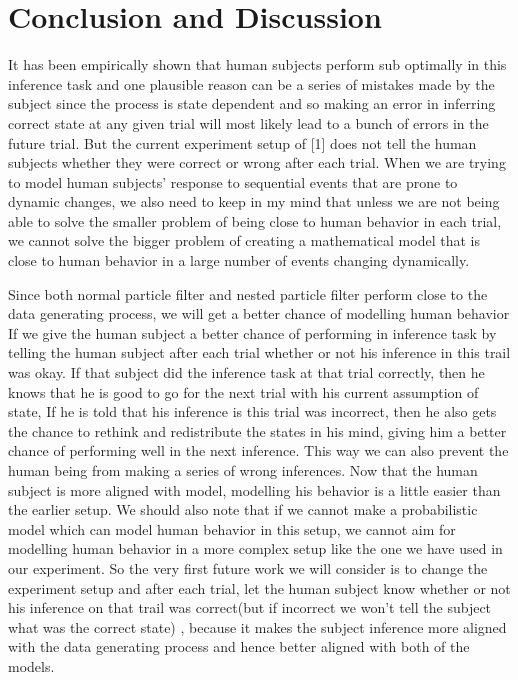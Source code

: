 \documentclass[12pt,letterpaper]{article}
\begin{document}
\section{Conclusion and Discussion}

It has been empirically shown that human subjects perform sub optimally in this inference task and one plausible reason can be a series of mistakes made by the subject since the process is state dependent and so making an error in inferring correct state at any given trial will most likely lead to a bunch of errors in the future trial. But the current experiment setup of [1] does not tell the human subjects whether they were correct or wrong after each trial. When we are trying to model human subjects’ response to sequential events that are prone to dynamic changes, we also need to keep in my mind that unless we are not being able to solve the smaller problem of being close to human behavior in each trial, we cannot solve the bigger problem of creating a mathematical model that is close to human behavior in a large number of events changing dynamically.

Since both normal particle filter and nested particle filter perform close to the data generating process, we will get a better chance of modelling human behavior If we give the human subject a better chance of performing in inference task by telling the human subject after each trial whether or not his inference in this trail was okay. If that subject did the inference task at that trial correctly, then he knows that he is good to go for the next trial with his current assumption of state, If he is told that his inference is this trial was incorrect, then he also gets the chance to rethink and redistribute the states in his mind, giving him a better chance of performing well in the next inference. This way we can also prevent the human being from making a series of wrong inferences. Now that the human subject is more aligned with model, modelling his behavior is a little easier than the earlier setup. We should also note that if we cannot make a probabilistic model which can model human behavior in this setup, we cannot aim for modelling human behavior in a more complex setup like the one we have used in our experiment. So the very first future work we will consider is to change the experiment setup and after each trial, let the human subject know whether or not his inference on that trail was correct(but if incorrect we won’t tell the subject what was the correct state) , because it makes the subject inference more aligned with the data generating process and hence better aligned with both of the models.
\end{document}
